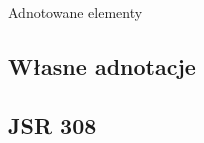 \documentclass{beamer}
\begin{document}
\begin{frame}{Adnotowane elementy}
  
  \pause
  
\end{frame}

  

\subsection{Własne adnotacje}
\subsection{JSR 308}
\begin{frame}
\end{frame}
\end{document}
